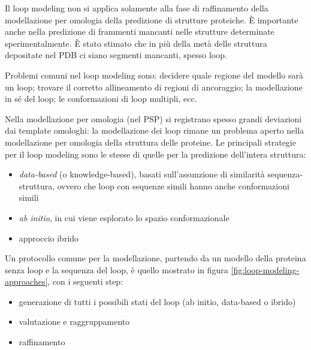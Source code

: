 {{Il loop modeling non si applica solamente alla fase di raffinamento della modellazione per omologia della predizione di strutture proteiche. È importante anche nella predizione di frammenti mancanti nelle strutture determinate sperimentalmente. È stato stimato che in più della metà delle struttura depositate nel PDB ci siano segmenti mancanti, spesso loop\supercite{karami2018dareus}.

\par Problemi comuni nel loop modeling sono: decidere quale regione del modello sarà un loop; trovare il corretto allineamento di regioni di ancoraggio; la modellazione in sé del loop; le conformazioni di loop multipli, ecc.

\par Nella modellazione per omologia (nel PSP) si registrano spesso grandi deviazioni dai template omologhi: la modellazione dei loop rimane un problema aperto nella modellazione per omologia della struttura delle proteine\supercite{karamiLoop}. Le principali strategie per il loop modeling sono le stesse di quelle per la predizione dell'intera struttura:
\begin{itemize}
	\item \textit{data-based} (o knowledge-based), basati sull'assunzione di similarità sequenza-struttura, ovvero che loop con sequenze simili hanno anche conformazioni simili
	\item \textit{ab initio}, in cui viene esplorato lo spazio conformazionale
	\item approccio ibrido
\end{itemize}

\par Un protocollo comune per la modellazione, partendo da un modello della proteina senza loop e la sequenza del loop, è quello mostrato in figura \ref{fig:loop-modeling-approaches}, con i seguenti step:
\begin{itemize}
	\item generazione di tutti i possibili stati del loop (ab initio, data-based o ibrido)
	\item valutazione e raggruppamento
	\item raffinamento
\end{itemize}

}}
